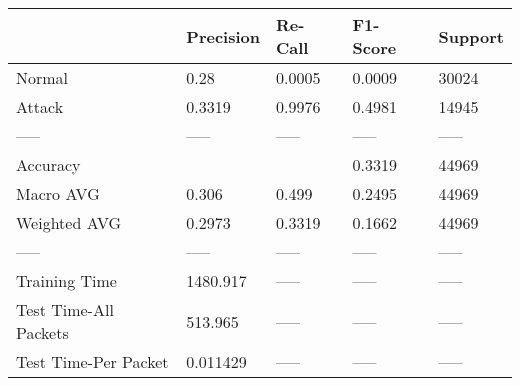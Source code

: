 \begin{tabular}{lllll}
\toprule
{} & Precision & Re-Call & F1-Score & Support \\
\midrule
Normal                &      0.28 &  0.0005 &   0.0009 &   30024 \\
Attack                &    0.3319 &  0.9976 &   0.4981 &   14945 \\
-----                 &     ----- &   ----- &    ----- &   ----- \\
Accuracy              &           &         &   0.3319 &   44969 \\
Macro AVG             &     0.306 &   0.499 &   0.2495 &   44969 \\
Weighted AVG          &    0.2973 &  0.3319 &   0.1662 &   44969 \\
-----                 &     ----- &   ----- &    ----- &   ----- \\
Training Time         &  1480.917 &   ----- &    ----- &   ----- \\
Test Time-All Packets &   513.965 &   ----- &    ----- &   ----- \\
Test Time-Per Packet  &  0.011429 &   ----- &    ----- &   ----- \\
\bottomrule
\end{tabular}
